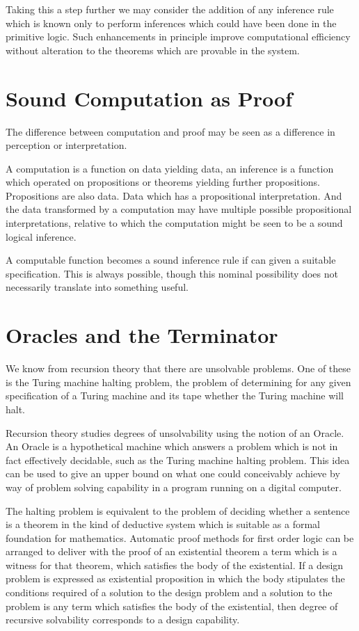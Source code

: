 Taking this a step further we may consider the addition of any
inference rule which is known only to perform inferences which could
have been done in the primitive logic.
Such enhancements in principle improve computational efficiency
without alteration to the theorems which are provable in the system.

\section{Sound Computation as Proof}

The difference between computation and proof may be seen as a difference in
perception or interpretation.

A computation is a function on data yielding data, an inference is a
function which operated on propositions or theorems yielding further propositions.
Propositions are also data.
Data which has a propositional interpretation.
And the data transformed by a computation may have multiple possible
propositional interpretations, relative to which the computation might
be seen to be a sound logical inference.

A computable function becomes a sound inference rule if can given a
suitable specification.
This is always possible, though this nominal possibility does not
necessarily translate into something useful.

\section{Oracles and the Terminator} 

We know from recursion theory that there are unsolvable problems.
One of these is the Turing machine halting problem, the problem of
determining for any given specification of a Turing machine and its
tape whether the Turing machine will halt.

Recursion theory studies degrees of unsolvability using the notion of
an Oracle.
An Oracle is a hypothetical machine which answers a problem which is
not in fact effectively decidable, such as the Turing machine halting
problem.
This idea can be used to give an upper bound on what one could
conceivably achieve by way of problem solving capability in a program
running on a digital computer.

The halting problem is equivalent to the problem of deciding whether a
sentence is a theorem in the kind of deductive system which is
suitable as a formal foundation for mathematics.
Automatic proof methods for first order logic can be arranged to
deliver with the proof of an existential theorem a term which is a
witness for that theorem, which satisfies the body of the existential.
If a design problem is expressed as existential proposition in which
the body stipulates the conditions required of a solution to the
design problem and a solution to the problem is any term which
satisfies the body of the existential, then degree of recursive
solvability corresponds to a design capability.

